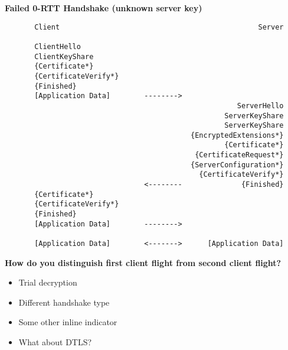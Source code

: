 \documentclass[helvetica]{seminar}
\newcommand{\heading}[1]{%
  \begin{center} 
    \large\bf 
    #1 
  \end{center} 
  \vspace{.4 in}}
\begin{document}
\begin{slide}
\heading{Failed 0-RTT Handshake (unknown server key)}

{\scriptsize
\begin{verbatim}
       Client                                               Server

       ClientHello
       ClientKeyShare
       {Certificate*}
       {CertificateVerify*}
       {Finished}              
       [Application Data]        -------->
                                                       ServerHello
                                                    ServerKeyShare
                                                    ServerKeyShare
                                            {EncryptedExtensions*}
                                                    {Certificate*}
                                             {CertificateRequest*}
                                            {ServerConfiguration*}
                                              {CertificateVerify*}
                                 <--------              {Finished}
       {Certificate*}
       {CertificateVerify*}
       {Finished}              
       [Application Data]        -------->

       [Application Data]        <------->      [Application Data]
\end{verbatim}
}
\end{slide}

\begin{slide}
\heading{How do you distinguish first client flight from second client flight?}

\begin{itemize}
\item Trial decryption
\item Different handshake type
\item Some other inline indicator
\item What about DTLS?
\end{itemize}

\end{slide}
\end{document}

